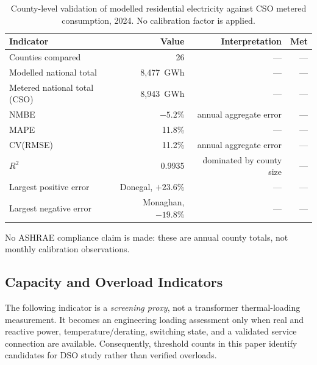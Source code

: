 \documentclass[preprint,12pt]{elsarticle}
\begin{document}
\begin{table}[H]
\centering
\caption{County-level validation of modelled residential electricity against
  CSO metered consumption, 2024. No calibration factor is applied.}
\label{tab:county_validation}
\small
\begin{tabular}{lrrr}
\toprule
\textbf{Indicator} & \textbf{Value} & \textbf{Interpretation} & \textbf{Met} \\
\midrule
Counties compared            & 26        & ---            & --- \\
Modelled national total      & 8{,}477~GWh & ---          & --- \\
Metered national total (CSO) & 8{,}943~GWh & ---          & --- \\
NMBE                         & $-5.2\%$  & annual aggregate error & --- \\
MAPE                         & 11.8\%    & ---            & --- \\
CV(RMSE)                     & 11.2\%    & annual aggregate error & --- \\
$R^{2}$                      & 0.9935    & dominated by county size & --- \\
\midrule
Largest positive error       & Donegal, $+23.6\%$ & --- & --- \\
Largest negative error       & Monaghan, $-19.8\%$ & --- & --- \\
\bottomrule
\end{tabular}
\smallskip
\noindent\footnotesize{No ASHRAE compliance claim is made: these are annual
county totals, not monthly calibration observations.}
\end{table}

\subsection{Capacity and Overload Indicators}
\label{sec:overload}

The following indicator is a \emph{screening proxy}, not a transformer
thermal-loading measurement. It becomes an engineering loading assessment
only when real and reactive power, temperature/derating, switching state,
and a validated service connection are available. Consequently, threshold
counts in this paper identify candidates for DSO study rather than verified
overloads.
\end{document}
